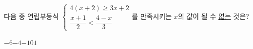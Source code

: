 다음 중 연립부등식 $\begin{cases} 4(x+2)\ge 3x+2 \\[0.6ex] \dfrac{x+1}{2}<\dfrac{4-x}{3} \end{cases}$를 만족시키는 $x$의 값이 될 수 \underline{없는} 것은?
\begin{choices32}{$-6$}{$-4$}{$-1$}{$0$}{$1$}\end{choices32}

